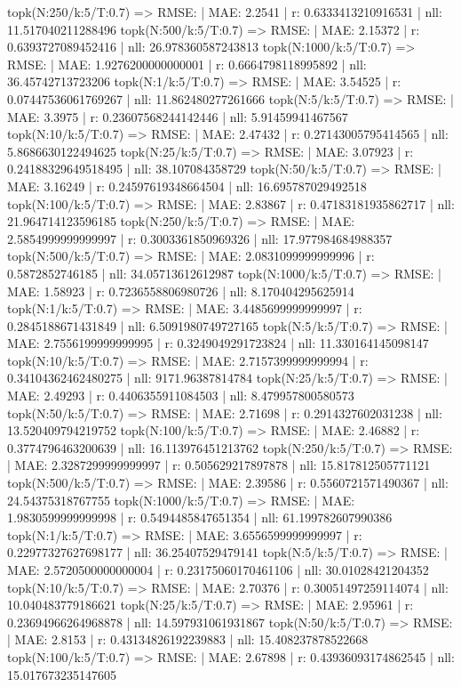topk(N:250/k:5/T:0.7) => RMSE: | MAE: 2.2541 | r: 0.6333413210916531 | nll: 11.517040211288496
topk(N:500/k:5/T:0.7) => RMSE: | MAE: 2.15372 | r: 0.6393727089452416 | nll: 26.978360587243813
topk(N:1000/k:5/T:0.7) => RMSE: | MAE: 1.9276200000000001 | r: 0.6664798118995892 | nll: 36.45742713723206
topk(N:1/k:5/T:0.7) => RMSE: | MAE: 3.54525 | r: 0.07447536061769267 | nll: 11.862480277261666
topk(N:5/k:5/T:0.7) => RMSE: | MAE: 3.3975 | r: 0.23607568244142446 | nll: 5.91459941467567
topk(N:10/k:5/T:0.7) => RMSE: | MAE: 2.47432 | r: 0.27143005795414565 | nll: 5.8686630122494625
topk(N:25/k:5/T:0.7) => RMSE: | MAE: 3.07923 | r: 0.24188329649518495 | nll: 38.107084358729
topk(N:50/k:5/T:0.7) => RMSE: | MAE: 3.16249 | r: 0.24597619348664504 | nll: 16.695787029492518
topk(N:100/k:5/T:0.7) => RMSE: | MAE: 2.83867 | r: 0.47183181935862717 | nll: 21.964714123596185
topk(N:250/k:5/T:0.7) => RMSE: | MAE: 2.5854999999999997 | r: 0.3003361850969326 | nll: 17.977984684988357
topk(N:500/k:5/T:0.7) => RMSE: | MAE: 2.0831099999999996 | r: 0.5872852746185 | nll: 34.05713612612987
topk(N:1000/k:5/T:0.7) => RMSE: | MAE: 1.58923 | r: 0.7236558806980726 | nll: 8.170404295625914
topk(N:1/k:5/T:0.7) => RMSE: | MAE: 3.4485699999999997 | r: 0.2845188671431849 | nll: 6.5091980749727165
topk(N:5/k:5/T:0.7) => RMSE: | MAE: 2.7556199999999995 | r: 0.3249049291723824 | nll: 11.330164145098147
topk(N:10/k:5/T:0.7) => RMSE: | MAE: 2.7157399999999994 | r: 0.34104362462480275 | nll: 9171.96387814784
topk(N:25/k:5/T:0.7) => RMSE: | MAE: 2.49293 | r: 0.4406355911084503 | nll: 8.479957800580573
topk(N:50/k:5/T:0.7) => RMSE: | MAE: 2.71698 | r: 0.2914327602031238 | nll: 13.520409794219752
topk(N:100/k:5/T:0.7) => RMSE: | MAE: 2.46882 | r: 0.3774796463200639 | nll: 16.113976451213762
topk(N:250/k:5/T:0.7) => RMSE: | MAE: 2.3287299999999997 | r: 0.505629217897878 | nll: 15.817812505771121
topk(N:500/k:5/T:0.7) => RMSE: | MAE: 2.39586 | r: 0.5560721571490367 | nll: 24.54375318767755
topk(N:1000/k:5/T:0.7) => RMSE: | MAE: 1.9830599999999998 | r: 0.5494485847651354 | nll: 61.199782607990386
topk(N:1/k:5/T:0.7) => RMSE: | MAE: 3.6556599999999997 | r: 0.22977327627698177 | nll: 36.25407529479141
topk(N:5/k:5/T:0.7) => RMSE: | MAE: 2.5720500000000004 | r: 0.23175060170461106 | nll: 30.01028421204352
topk(N:10/k:5/T:0.7) => RMSE: | MAE: 2.70376 | r: 0.30051497259114074 | nll: 10.040483779186621
topk(N:25/k:5/T:0.7) => RMSE: | MAE: 2.95961 | r: 0.23694966264968878 | nll: 14.597931061931867
topk(N:50/k:5/T:0.7) => RMSE: | MAE: 2.8153 | r: 0.43134826192239883 | nll: 15.408237878522668
topk(N:100/k:5/T:0.7) => RMSE: | MAE: 2.67898 | r: 0.43936093174862545 | nll: 15.017673235147605
